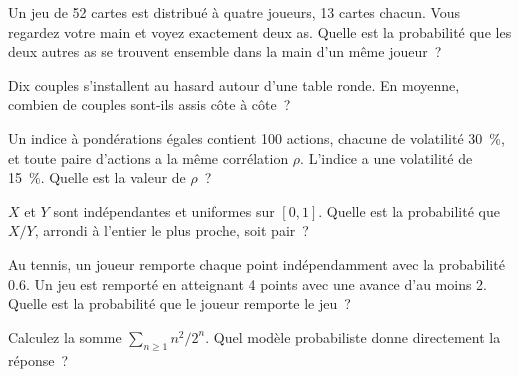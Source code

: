 
\begin{question}\label{iq:iv1:timed-test-2:7}
Un jeu de 52 cartes est distribué à quatre joueurs, 13 cartes chacun. Vous regardez votre main et voyez exactement deux as. Quelle est la probabilité que les deux autres as se trouvent ensemble dans la main d'un même joueur~?
\end{question}

\begin{question}\label{iq:iv1:timed-test-2:8}
Dix couples s'installent au hasard autour d'une table ronde. En moyenne, combien de couples sont-ils assis côte à côte~?
\end{question}

\begin{question}\label{iq:iv1:timed-test-2:9}
Un indice à pondérations égales contient 100 actions, chacune de volatilité 30~\%, et toute paire d'actions a la même corrélation $\rho$. L'indice a une volatilité de 15~\%. Quelle est la valeur de $\rho$~?
\end{question}

\begin{question}\label{iq:iv1:timed-test-2:10}
$X$ et $Y$ sont indépendantes et uniformes sur $[0, 1]$. Quelle est la probabilité que $X/Y$, arrondi à l'entier le plus proche, soit pair~?
\end{question}

\begin{question}\label{iq:iv1:timed-test-2:11}
Au tennis, un joueur remporte chaque point indépendamment avec la probabilité $0.6$. Un jeu est remporté en atteignant 4 points avec une avance d'au moins 2. Quelle est la probabilité que le joueur remporte le jeu~?
\end{question}

\begin{question}\label{iq:iv1:timed-test-2:12}
Calculez la somme $\sum_{n \ge 1}n^2/2^n$. Quel modèle probabiliste donne directement la réponse~?
\end{question}
